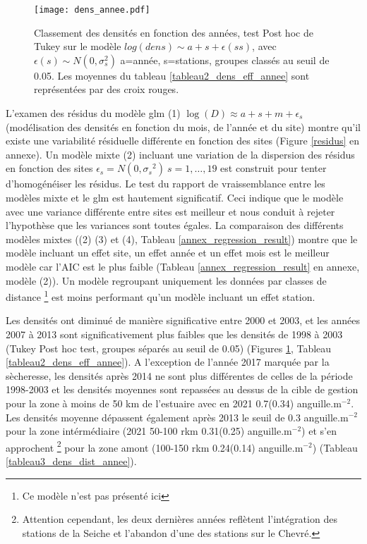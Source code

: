 \documentclass[10pt,twocolumn,titlepage,twoside]{article}\usepackage[]{graphicx}\usepackage[]{color}
\begin{document}
\begin{figure}[htbp]
\centering
 \texttt{[image: dens\_annee.pdf]} 
\caption[Tendance des densités modèle]{Classement des densités en fonction des
années, test Post hoc de Tukey sur le modèle $log(dens) \sim a +s +
\epsilon(ss)$, avec $\epsilon(s) \sim N(0,\sigma_s^2)$ a=année, s=stations,
groupes classés au seuil de 0.05. Les moyennes du tableau
\ref{tableau2_dens_eff_annee} sont représentées par des croix rouges.
}
\label{dens_annee}
\end{figure}

L'examen des résidus du modèle glm (1) $\log
(D){\approx}a+s+m+\epsilon_s$ (modélisation des densités en fonction du mois, de
l'année et du site) montre qu'il existe une variabilité résiduelle différente en fonction des sites (Figure \ref{residus} en annexe).  Un
modèle mixte (2) incluant une variation de la dispersion des résidus en fonction
des sites $\epsilon_s=N(0,{\sigma_{s}}^2) ~s=1,\dots,19$
\citep{zuur_mixed_2009} est construit pour tenter d'homogénéiser les résidus. Le
test du rapport de vraissemblance entre les modèles mixte et le glm est
hautement significatif. Ceci indique que le modèle avec une variance différente entre
sites est meilleur et nous conduit à rejeter l'hypothèse que les variances sont
toutes égales.
La comparaison des différents modèles mixtes ((2) (3) et (4), Tableau
\ref{annex_regression_result}) montre
que le modèle incluant un effet site, un effet année et un effet mois est le
meilleur modèle car l'AIC est le plus faible (Tableau
\ref{annex_regression_result} en annexe, modèle (2)). Un modèle regroupant
uniquement les données par classes de distance \footnote{Ce modèle n'est pas présenté ici} est moins performant
qu'un modèle incluant un effet station.

Les densités ont diminué de manière
significative entre 2000 et 2003, et les années 2007 à 2013
sont significativement plus faibles que les densités de 1998 à 2003 (Tukey
Post hoc test, groupes séparés au seuil de 0.05) (Figures \ref{dens_annee},
Tableau \ref{tableau2_dens_eff_annee}).
A l'exception de l'année 2017 marquée par la sècheresse, les densités après 2014
ne sont plus différentes de celles de la période 1998-2003 et les densités moyennes sont
repassées au dessus de la cible de gestion pour la zone à moins de 50 km de
l'estuaire avec en 2021 0.7(0.34) anguille.m$^{-2}$. Les
densités moyenne dépassent également après 2013 le seuil de 0.3
anguille.m$^{-2}$ pour la zone intérmédiaire (2021 50-100 rkm 0.31(0.25)
anguille.m$^{-2}$) et s'en approchent \footnote{Attention cependant, les deux
dernières années reflètent l'intégration des stations de la Seiche et l'abandon d'une des
stations sur le Chevré.} pour la zone amont (100-150 rkm
0.24(0.14) anguille.m$^{-2}$) (Tableau \ref{tableau3_dens_dist_annee}). 
\end{document}
